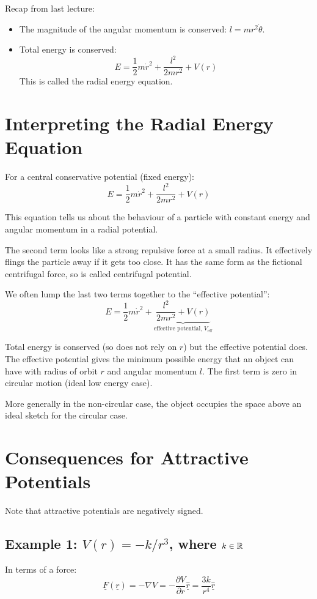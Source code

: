
Recap from last lecture:
\begin{itemize}
    \item The magnitude of the angular momentum is conserved: $l = mr^2 \dot{\theta}$.
    \item Total energy is conserved:
    \[
        E = \frac{1}{2} m \dot{r}^2 + \frac{l^2}{2mr^2} + V(r)
    \]
    This is called the radial energy equation.
\end{itemize}

\section{Interpreting the Radial Energy Equation}
For a central conservative potential (fixed energy):
\[
    E = \frac{1}{2} m \dot{r}^2 + \frac{l^2}{2mr^2} + V(r)
\]

This equation tells us about the behaviour of a particle with constant energy and angular momentum in a radial potential.

The second term looks like a strong repulsive force at a small radius. It effectively flings the particle away if it gets too close. It has the same form as the fictional centrifugal force, so is called centrifugal potential.

We often lump the last two terms together to the ``effective potential'':
\[
    E = \frac{1}{2} m \dot{r}^2 + \underbrace{\frac{l^2}{2mr^2} + V(r)}_\text{effective potential, $V_\text{eff}$}
\]

Total energy is conserved (so does not rely on $r$) but the effective potential does. The effective potential gives the minimum possible energy that an object can have with radius of orbit $r$ and angular momentum $l$. The first term is zero in circular motion (ideal low energy case).

More generally in the non-circular case, the object occupies the space above an ideal sketch for the circular case.

\section{Consequences for Attractive Potentials}
Note that attractive potentials are negatively signed.

\subsection{Example 1: $V(r) = -k/r^3$, where $k \in \mathbb{R}$}
In terms of a force:
\[
\underline{F}(\underline{r}) = -\nabla V = - \frac{\partial V}{\partial r} \hat{\underline{r}} = \frac{3k}{r^4} \hat{\underline{r}}
\]

